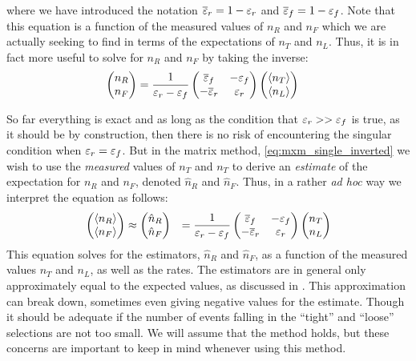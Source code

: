 where we have introduced the notation $\overline{\varepsilon}_r = 1-\varepsilon_r$
and $\overline{\varepsilon}_f =1-\varepsilon_f$.
Note that this equation is a function of the measured values of
$n_R$ and $n_F$ which we are actually seeking to find in terms of the 
expectations of $n_T$ and $n_L$. Thus, it is in fact more
useful to solve for $n_R$ and $n_F$ by taking the inverse:
\begin{align}
  \label{eq:mxm_single_inverted}
  \begin{pmatrix} n_R \\ n_F \end{pmatrix} 
  &= 
  \frac{1}{\varepsilon_r-\varepsilon_f}
  \begin{pmatrix}
  \overline{\varepsilon}_f & -\varepsilon_f \\ -\overline{\varepsilon}_r & \varepsilon_r
  \end{pmatrix} 
  \begin{pmatrix} \langle n_T\rangle \\ \langle n_L\rangle \end{pmatrix}
\end{align}

So far everything is exact and as long as the condition
that $\varepsilon_r>>\varepsilon_f$ is true,
as it should be by construction, 
then there is no risk of encountering the singular condition
when $\varepsilon_r=\varepsilon_f$.
But in the matrix method, \eqn\eqref{eq:mxm_single_inverted}
we wish to use the \emph{measured} values of $n_T$
and $n_T$ to derive an \emph{estimate} of the expectation
for $n_R$ and $n_F$, denoted $\hat{n}_R$ and $\hat{n}_F$. 
Thus, in a rather \emph{ad hoc} way 
we interpret the equation as follows:
\begin{align}
  \label{eq:mxm_single_inverted_approx}
  \begin{pmatrix} \langle n_R\rangle \\ \langle n_F\rangle \end{pmatrix} 
  &\approx
  \begin{pmatrix} \hat{n}_R \\ \hat{n}_F \end{pmatrix} 
  &= 
  \frac{1}{\varepsilon_r-\varepsilon_f}
  \begin{pmatrix}
  \overline{\varepsilon}_f & -\varepsilon_f \\ -\overline{\varepsilon}_r & \varepsilon_r
  \end{pmatrix} 
  \begin{pmatrix} n_T \\ n_L \end{pmatrix}
\end{align}
This equation solves for the estimators, $\hat{n}_R$ and $\hat{n}_F$,
as a function of the measured values $n_T$ and $n_L$, as well 
as the rates. The estimators are in general only approximately equal
to the expected values, as discussed in \cite{Gillam:2014xua}.
This approximation can break down, sometimes even giving negative values
for the estimate.  Though it should be adequate if the number
of events falling in the ``tight'' and ``loose'' selections are 
not too small.
We will assume that the method holds, but these concerns are important
to keep in mind whenever using this method.


